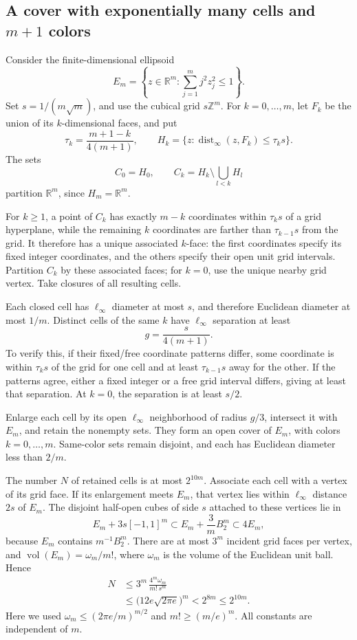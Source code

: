 \documentclass[11pt,a4paper]{article}
\newcommand{\R}{\mathbb R}
\theoremstyle{definition}
\theoremstyle{remark}
\numberwithin{equation}{section}
\begin{document}
\subsection{A cover with exponentially many cells and \texorpdfstring{\(m+1\)}{m+1} colors}

Consider the finite-dimensional ellipsoid
\[
             E_m=\left\{z\in\R^m:
                         \sum_{j=1}^m j^2z_j^2\le1\right\}.
 \tag{639.4}
\]
Set \(s=1/(m\sqrt m)\), and use the cubical grid \(s\mathbb Z^m\).
For \(k=0,\ldots,m\), let \(F_k\) be the union of its
\(k\)-dimensional faces, and put
\[
 \tau_k=\frac{m+1-k}{4(m+1)},\qquad
 H_k=\{z:\operatorname{dist}_\infty(z,F_k)\le\tau_ks\}.
 \tag{639.5}
\]
The sets
\[
                  C_0=H_0,\qquad
                  C_k=H_k\setminus\bigcup_{l<k}H_l
 \tag{639.6}
\]
partition \(\R^m\), since \(H_m=\R^m\).

For \(k\ge1\), a point of \(C_k\) has exactly \(m-k\) coordinates
within \(\tau_ks\) of a grid hyperplane, while the remaining
\(k\) coordinates are farther than \(\tau_{k-1}s\) from the grid.
It therefore has a unique associated \(k\)-face: the first
coordinates specify its fixed integer coordinates, and the others
specify their open unit grid intervals. Partition \(C_k\) by these
associated faces; for \(k=0\), use the unique nearby grid vertex.
Take closures of all resulting cells.

Each closed cell has \(\ell_\infty\) diameter at most \(s\), and
therefore Euclidean diameter at most \(1/m\). Distinct cells of the
same \(k\) have \(\ell_\infty\) separation at least
\[
                            g=\frac{s}{4(m+1)}.
 \tag{639.7}
\]
To verify this, if their fixed/free coordinate patterns differ,
some coordinate is within \(\tau_ks\) of the grid for one cell and
at least \(\tau_{k-1}s\) away for the other. If the patterns agree,
either a fixed integer or a free grid interval differs, giving at
least that separation. At \(k=0\), the separation is at least \(s/2\).

Enlarge each cell by its open \(\ell_\infty\) neighborhood of radius
\(g/3\), intersect it with \(E_m\), and retain the nonempty sets.
They form an open cover of \(E_m\), with colors \(k=0,\ldots,m\).
Same-color sets remain disjoint, and each has Euclidean diameter
less than \(2/m\).

The number \(N\) of retained cells is at most \(2^{10m}\). Associate
each cell with a vertex of its grid face. If its enlargement meets
\(E_m\), that vertex lies within \(\ell_\infty\) distance \(2s\)
of \(E_m\). The disjoint half-open cubes of side \(s\) attached to
these vertices lie in
\[
 E_m+3s[-1,1]^m
      \subset E_m+\frac3m B_2^m
      \subset4E_m ,
 \tag{639.8}
\]
because \(E_m\) contains \(m^{-1}B_2^m\).
There are at most \(3^m\) incident grid faces per vertex, and
\(\operatorname{vol}(E_m)=\omega_m/m!\), where \(\omega_m\) is
the volume of the Euclidean unit ball. Hence
\[
\begin{split}
 N&\le 3^m\,\frac{4^m\omega_m}{m!\,s^m}\\
  &\le \bigl(12e\sqrt{2\pi e}\bigr)^m
   <2^{8m}\le2^{10m}.
\end{split}
 \tag{639.9}
\]
Here we used
\(\omega_m\le(2\pi e/m)^{m/2}\) and \(m!\ge(m/e)^m\).
All constants are independent of \(m\).
\end{document}
